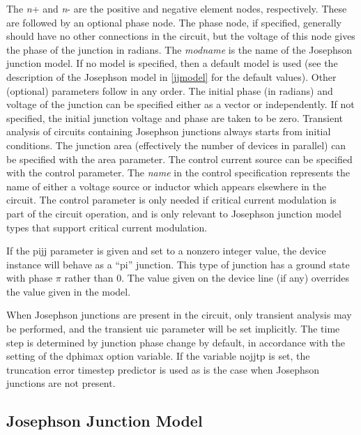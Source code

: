 
The {\it n\/}{\vt +} and {\it n\/}{\vt -} are the positive and
negative element nodes, respectively.  These are followed by an
optional phase node.  The phase node, if specified, generally should
have no other connections in the circuit, but the voltage of this node
gives the phase of the junction in radians.  The {\it modname} is the
name of the Josephson junction model.  If no model is specified, then
a default model is used (see the description of the Josephson model in
\ref{jjmodel} for the default values).  Other (optional) parameters
follow in any order.  The initial phase (in radians) and voltage of
the junction can be specified either as a vector or independently.  If
not specified, the initial junction voltage and phase are taken to be
zero.  Transient analysis of circuits containing Josephson junctions
always starts from initial conditions.  The junction area (effectively
the number of devices in parallel) can be specified with the {\vt
area} parameter.  The control current source can be specified with the
{\vt control} parameter.  The {\it name} in the control specification
represents the name of either a voltage source or inductor which
appears elsewhere in the circuit.  The {\vt control} parameter is only
needed if critical current modulation is part of the circuit
operation, and is only relevant to Josephson junction model types that
support critical current modulation.

If the {\vt pijj} parameter is given and set to a nonzero integer
value, the device instance will behave as a ``pi'' junction.  This
type of junction has a ground state with phase $\pi$ rather than 0. 
The value given on the device line (if any) overrides the value given
in the model.

When Josephson junctions are present in the circuit, only transient
analysis may be performed, and the transient {\vt uic} parameter will
be set implicitly.  The time step is determined by junction phase
change by default, in accordance with the setting of the {\et dphimax}
option variable.  If the variable {\et nojjtp} is set, the truncation
error timestep predictor is used as is the case when Josephson
junctions are not present.

\subsection{Josephson Junction Model}
\label{jjmodel}

